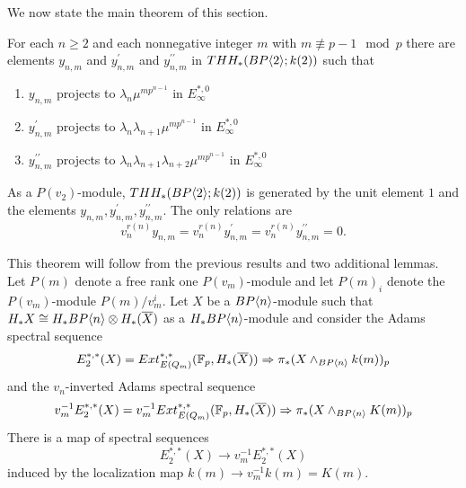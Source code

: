 We now state the main theorem of this section. 
\begin{thm}\label{mod p v_1}
For each $n \ge 2$ and each nonnegative integer $m$ with $m \not\equiv p - 1 \mod{p}$ there are elements $y_{n,m}$ and $y^{\prime}_{n,m}$ and $y^{\prime \prime}_{n,m}$ in $THH_*(BP\langle 2 \rangle;k(2))$ such that
\begin{enumerate} 
\item $y_{n,m}$ projects to $\lambda_n\mu^{mp^{n-1}}$ in $E_{\infty}^{*,0}$
\item $y_{n,m}^{\prime}$ projects to $\lambda_n\lambda_{n+1}\mu^{mp^{n-1}}$ in $E_{\infty}^{*,0}$
\item $y_{n,m}^{\prime\prime}$ projects to $\lambda_n\lambda_{n+1}\lambda_{n+2}\mu^{mp^{n-1}}$ in $E_{\infty}^{*,0}$
\end{enumerate}
 As a $P(v_2)$-module, $THH_*(BP\langle 2 \rangle;k(2))$ is generated by the unit element
$1$ and the elements $y_{n,m},y_{n,m}^{\prime},y_{n,m}^{\prime \prime}$. The only relations are
\[v_n^{r(n)}y_{n,m}=v_n^{r(n)}y_{n,m}^{\prime}=v_n^{r(n)}y_{n,m}^{\prime\prime}=0.\]
\end{thm}
This theorem will follow from the previous results and two additional lemmas. 
Let $P(m)$ denote a free rank one $P(v_m)$-module and let $P(m)_i$ denote the $P(v_m)$-module $P(m)/v_m^i$. Let $X$ be a $BP\langle n \rangle$-module such that $H_*X\cong H_*BP\langle n \rangle\otimes H_*(\overline{X})$ as a $H_*BP\langle n \rangle$-module and consider the Adams spectral sequence
\begin{equation}\label{ASSX} E_2^{*,*}(X)=Ext_{E(Q_m)}^{*,*}(\mathbb{F}_p,H_*(\overline{X}))\Rightarrow \pi_*(X\wedge_{BP\langle n \rangle}k(m))_p\end{equation}
and the $v_n$-inverted Adams spectral sequence 
\begin{equation}\label{v2invertASSX} v_m^{-1}E_2^{*,*}(X)=v_m^{-1}Ext_{E(Q_m)}^{*,*}(\mathbb{F}_p,H_*(\overline{X})) \Rightarrow \pi_*(X\wedge_{BP\langle n \rangle}K(m))_p\end{equation}
There is a map of spectral sequences 
\[ E_2^{*,*}(X) \longrightarrow v_m^{-1}E_2^{*,*}(X)\]
induced by the localization map $k(m)\to v_m^{-1}k(m)=K(m).$ 

